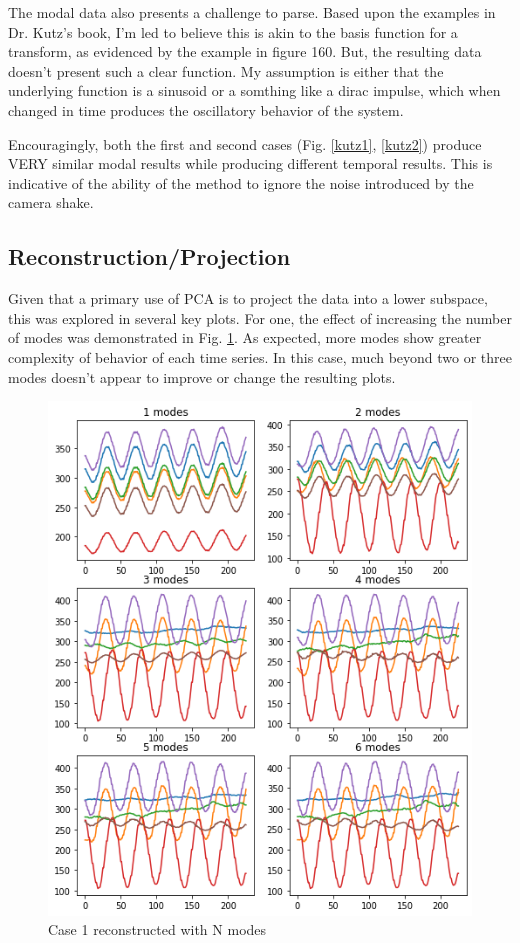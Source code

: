 \documentclass[journal]{IEEEtran}
\begin{document}
The modal data also presents a challenge to parse. Based upon the examples in Dr. Kutz's book, I'm
led to believe this is akin to the basis function for a transform, as evidenced by the example in
figure 160. But, the resulting data doesn't present such a clear function. My assumption is either
that the underlying function is a sinusoid or a somthing like a dirac impulse, which when changed
in time produces the oscillatory behavior of the system.

Encouragingly, both the first and second cases (Fig. \ref{kutz1}, \ref{kutz2}) produce VERY
similar modal results while producing different temporal results. This is indicative of the
ability of the method to ignore the noise introduced by the camera shake.

\subsection{Reconstruction/Projection}
Given that a primary use of PCA is to project the data into a lower subspace, this was explored in
several key plots. For one, the effect of increasing the number of modes was demonstrated in Fig.
\ref{changing_recon}. As expected, more modes show greater complexity of behavior of each time
series. In this case, much beyond two or three modes doesn't appear to improve or change the
resulting plots.
\begin{figure}
	\centerline{\includegraphics[width=\columnwidth]{changing_recon.png}}
	\caption{Case 1 reconstructed with N modes}
	\label{changing_recon}
\end{figure}
\end{document}
